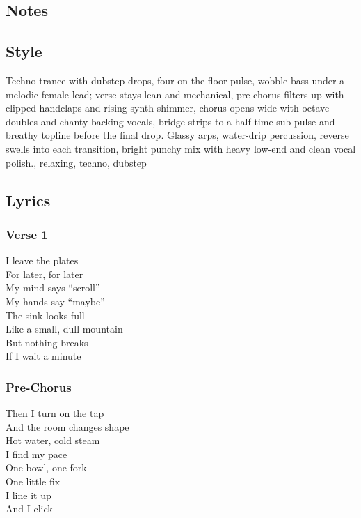 \subsection{Notes}\label{notes-28}

\subsection{Style}\label{style-27}

Techno-trance with dubstep drops, four-on-the-floor pulse, wobble bass
under a melodic female lead; verse stays lean and mechanical, pre-chorus
filters up with clipped handclaps and rising synth shimmer, chorus opens
wide with octave doubles and chanty backing vocals, bridge strips to a
half-time sub pulse and breathy topline before the final drop. Glassy
arps, water-drip percussion, reverse swells into each transition, bright
punchy mix with heavy low-end and clean vocal polish., relaxing, techno,
dubstep

\subsection{Lyrics}\label{lyrics-27}

\subsubsection{Verse 1}\label{verse-1-21}

I leave the plates\\
For later, for later\\
My mind says ``scroll''\\
My hands say ``maybe''\\
The sink looks full\\
Like a small, dull mountain\\
But nothing breaks\\
If I wait a minute

\subsubsection{Pre-Chorus}\label{pre-chorus-46}

Then I turn on the tap\\
And the room changes shape\\
Hot water, cold steam\\
I find my pace\\
One bowl, one fork\\
One little fix\\
I line it up\\
And I click

